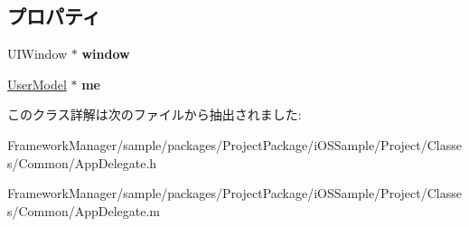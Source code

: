\subsection*{プロパティ}
\begin{DoxyCompactItemize}
\item 
\hypertarget{interface_app_delegate_acf48ac24125e688cac1a85445cd7fac2}{}U\+I\+Window $\ast$ {\bfseries window}\label{interface_app_delegate_acf48ac24125e688cac1a85445cd7fac2}

\item 
\hypertarget{interface_app_delegate_af317dc42f87a36c6acd5dc9da52aa90a}{}\hyperlink{interface_user_model}{User\+Model} $\ast$ {\bfseries me}\label{interface_app_delegate_af317dc42f87a36c6acd5dc9da52aa90a}

\end{DoxyCompactItemize}


このクラス詳解は次のファイルから抽出されました\+:\begin{DoxyCompactItemize}
\item 
Framework\+Manager/sample/packages/\+Project\+Package/i\+O\+S\+Sample/\+Project/\+Classes/\+Common/App\+Delegate.\+h\item 
Framework\+Manager/sample/packages/\+Project\+Package/i\+O\+S\+Sample/\+Project/\+Classes/\+Common/App\+Delegate.\+m\end{DoxyCompactItemize}
